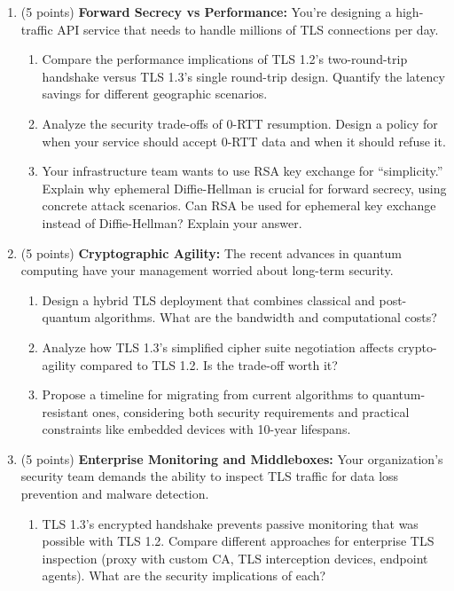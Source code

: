 \documentclass[10pt,a4paper,american]{article}
\begin{document}
\begin{enumerate}
	\item (5 points) \textbf{Forward Secrecy vs Performance:}
	      You're designing a high-traffic API service that needs to handle millions of TLS connections per day.
	      \begin{enumerate}
		      \item Compare the performance implications of TLS 1.2's two-round-trip handshake versus TLS 1.3's single round-trip design. Quantify the latency savings for different geographic scenarios.
		      \item Analyze the security trade-offs of 0-RTT resumption. Design a policy for when your service should accept 0-RTT data and when it should refuse it.
		      \item Your infrastructure team wants to use RSA key exchange for ``simplicity.'' Explain why ephemeral Diffie-Hellman is crucial for forward secrecy, using concrete attack scenarios. Can RSA be used for ephemeral key exchange instead of Diffie-Hellman? Explain your answer.
	      \end{enumerate}
	\item (5 points) \textbf{Cryptographic Agility:}
	      The recent advances in quantum computing have your management worried about long-term security.
	      \begin{enumerate}
		      \item Design a hybrid TLS deployment that combines classical and post-quantum algorithms. What are the bandwidth and computational costs?
		      \item Analyze how TLS 1.3's simplified cipher suite negotiation affects crypto-agility compared to TLS 1.2. Is the trade-off worth it?
		      \item Propose a timeline for migrating from current algorithms to quantum-resistant ones, considering both security requirements and practical constraints like embedded devices with 10-year lifespans.
	      \end{enumerate}
	\item (5 points) \textbf{Enterprise Monitoring and Middleboxes:}
	      Your organization's security team demands the ability to inspect TLS traffic for data loss prevention and malware detection.
	      \begin{enumerate}
		      \item TLS 1.3's encrypted handshake prevents passive monitoring that was possible with TLS 1.2. Compare different approaches for enterprise TLS inspection (proxy with custom CA, TLS interception devices, endpoint agents). What are the security implications of each?

\end{enumerate}
\end{enumerate}
\end{document}

